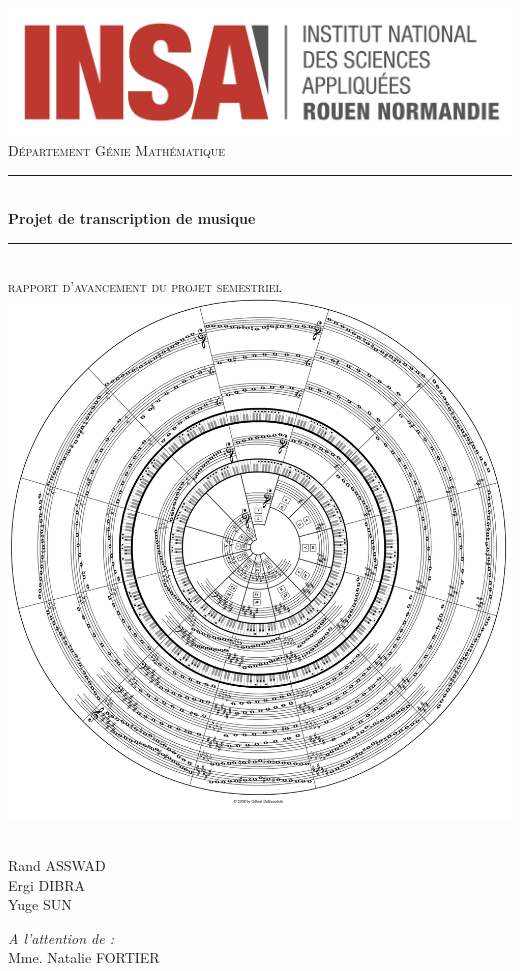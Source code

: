 \documentclass[a4paper]{article}
\newcommand{\HRule}{\rule{\linewidth}{0.5mm}}
\begin{document}
\begin{titlepage}
  \begin{sffamily}
  \begin{center}

    \includegraphics[scale=0.15]{INSA_logo}\\[2cm]

    \textsc{\huge Département Génie Mathématique}\\[0.7cm]

    \HRule \\[0.4cm]
    {\huge \bfseries Projet de transcription de musique \\[0.4cm]}
    \HRule \\[1cm]
	\textsc{\huge rapport d'avancement du projet semestriel}\\[0.7cm]

    \includegraphics[width=.6\textwidth]{fifths_circle.png}~\\[1cm]

    \begin{minipage}{0.4\textwidth}
		\Large\raggedright
        Rand ASSWAD\\
		Ergi DIBRA\\
		Yuge SUN
    \end{minipage}
    \begin{minipage}{0.4\textwidth}
		\Large\raggedleft
		\emph{A l'attention de :}\\
		Mme. Natalie FORTIER
    \end{minipage}

	\vfill
  \end{center}
  \end{sffamily}
\end{titlepage}
\end{document}
